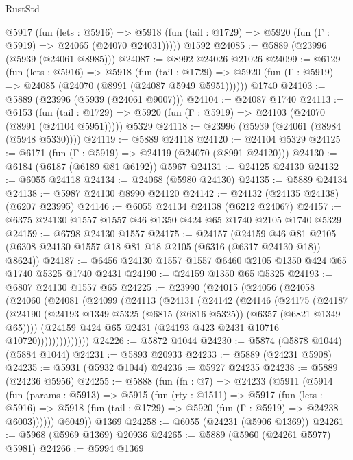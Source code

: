 \begin{lexlean}{RustStd}
\begin{coremodule}
    @5917
      (fun (lets : @5916) =>
      @5918 (fun (tail : @1729) => @5920 (fun (Γ : @5919) => @24065 (@24070 @24031)))))
    @1592
@24085 := @5889 (@23996 (@5939 (@24061 @8985)))
@24087 := @8992 @24026 @21026
@24099 := @6129
    (fun (lets : @5916) =>
    @5918
      (fun (tail : @1729) =>
      @5920 (fun (Γ : @5919) => @24085 (@24070 (@8991 (@24087 @5949 @5951))))))
    @1740
@24103 := @5889 (@23996 (@5939 (@24061 @9007)))
@24104 := @24087 @1740
@24113 := @6153
    (fun (tail : @1729) => @5920 (fun (Γ : @5919) => @24103 (@24070 (@8991 (@24104 @5951)))))
    @5329
@24118 := @23996 (@5939 (@24061 (@8984 (@5948 @5330))))
@24119 := @5889 @24118
@24120 := @24104 @5329
@24125 := @6171 (fun (Γ : @5919) => @24119 (@24070 (@8991 @24120)))
@24130 := @6184 (@6187 (@6189 @81 @6192)) @5967
@24131 := @24125 @24130
@24132 := @6055 @24118
@24134 := @24068 (@5980 @24130)
@24135 := @5889 @24134
@24138 := @5987 @24130 @8990 @24120
@24142 := @24132 (@24135 @24138) (@6207 @23995)
@24146 := @6055 @24134 @24138 (@6212 @24067)
@24157 := @6375 @24130 @1557 @1557 @46 @1350 @424 @65 @1740 @2105 @1740 @5329
@24159 := @6798 @24130 @1557
@24175 := @24157
    (@24159 @46 @81 @2105 (@6308 @24130 @1557 @18 @81 @18 @2105 (@6316 (@6317 @24130 @18)) @8624))
@24187 := @6456 @24130 @1557 @1557 @6460 @2105 @1350 @424 @65 @1740 @5325 @1740 @2431
@24190 := @24159 @1350 @65 @5325
@24193 := @6807 @24130 @1557 @65
@24225 := @23990
    (@24015
      (@24056
        (@24058
          (@24060
            (@24081
              (@24099
                (@24113
                  (@24131
                    (@24142
                      (@24146
                        (@24175
                          (@24187
                            (@24190
                              (@24193 @1349 @5325 (@6815 (@6816 @5325)) (@6357 (@6821 @1349 @65))))
                            (@24159 @424 @65 @2431 (@24193 @423 @2431 @10716 @10720))))))))))))))
@24226 := @5872 @1044
@24230 := @5874 (@5878 @1044) (@5884 @1044)
@24231 := @5893 @20933
@24233 := @5889 (@24231 @5908)
@24235 := @5931 (@5932 @1044)
@24236 := @5927 @24235
@24238 := @5889 (@24236 @5956)
@24255 := @5888
    (fun (fn : @7) =>
    @24233
      (@5911
        (@5914
          (fun (params : @5913) =>
          @5915
            (fun (rty : @1511) =>
            @5917
              (fun (lets : @5916) =>
              @5918 (fun (tail : @1729) => @5920 (fun (Γ : @5919) => @24238 @6003))))))
        @6049))
    @1369
@24258 := @6055 (@24231 (@5906 @1369))
@24261 := @5968 (@5969 @1369) @20936
@24265 := @5889 (@5960 (@24261 @5977) @5981)
@24266 := @5994 @1369

\end{coremodule}
\end{lexlean}
